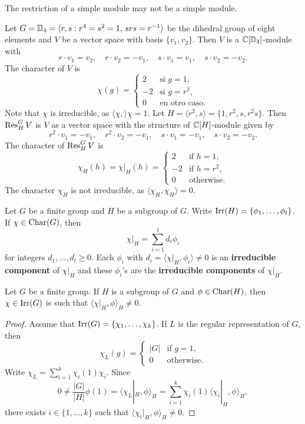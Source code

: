 The restriction of a simple module may not be a simple module. 

\begin{example}
    Let $G=\mathbb{D}_4=\langle r,s:r^4=s^2=1,\,srs=r^{-1}\rangle$ be the dihedral
    group of eight elements and 
    $V$ be a vector space with basis $\{v_1,v_2\}$. Then 
    $V$ is a $\mathbb{C}[\mathbb{D}_4]$-module with 
    \[
    r\cdot v_1=v_2,\quad
    r\cdot v_2=-v_1,\quad
    s\cdot v_1=v_1,\quad
    s\cdot v_2=-v_2.
    \]
    The character of $V$ is 
    \[
    \chi(g)=\begin{cases}
    2 & \text{si $g=1$},\\
    -2 & \text{si $g=r^2$},\\
    0 & \text{en otro caso}.
    \end{cases}
    \]
    Note that $\chi$ is irreducible, as $\langle\chi,\rangle\chi=1$.
    Let 
    $H=\langle r^2,s\rangle=\{1,r^2,s,r^2s\}$. Then $\operatorname{Res}_H^GV$ is $V$ as
    a vector space with the structure of 
    $\mathbb{C}[H]$-module given by 
    \[
    r^2\cdot v_1=-v_1,\quad
    r^2\cdot v_2=-v_1,\quad
    s\cdot v_1=-v_1,\quad
    s\cdot v_2=-v_2.
    \]
    The character of $\operatorname{Res}_H^GV$ is
    \[
    \chi_H(h)=\chi|_H(h)
    =\begin{cases}
    2 & \text{if $h=1$},\\
    -2 & \text{if $h=r^2$},\\
    0 & \text{otherwise}.
    \end{cases}
    \]
    The character $\chi_H$ is not irreducible, as 
    $\langle\chi_H,\chi_H\rangle=0$. 
\end{example}

Let $G$ be a finite group and 
$H$ be a subgroup of $G$. Write 
$\operatorname{Irr}(H)=\{\phi_1,\dots,\phi_l\}$.
If $\chi\in\operatorname{Char}(G)$, then
\[
\chi|_H=\sum_{i=1}^ld_i\phi_i
\]
for integers $d_1,\dots,d_l\geq 0$. 
Each $\phi_i$ with $d_i=\langle\chi|_H,\phi_i\rangle\ne 0$ 
is an \textbf{irreducible component} of $\chi|_H$ and these 
$\phi_i$'s are the \textbf{irreducible components} of 
$\chi|_H$. 

\begin{proposition}
    Let $G$ be a finite group. 
    If $H$ is a subgroup of $G$ and $\phi\in\operatorname{Char}(H)$, 
    then $\chi\in\operatorname{Irr}(G)$ is such that $\langle\chi|_H,\phi\rangle_H\ne 0$.
\end{proposition}

\begin{proof}
    Assume that $\operatorname{Irr}(G)=\{\chi_1,\dots,\chi_k\}$. 
    If $L$ is the regular representation of $G$, then 
    \[
    \chi_L(g)=\begin{cases}
    |G| & \text{if $g=1$},\\
    0 & \text{otherwise}.
    \end{cases}
    \]
    Write $\chi_L=\sum_{i=1}^k\chi_i(1)\chi_i$. Since 
    \[
    0\ne \frac{|G|}{|H|}\phi(1)=\langle \chi_L|_H,\phi\rangle_H=\sum_{i=1}^k\chi_i(1)\langle\chi_i|_H,\phi\rangle_H,
    \]
    there exists $i\in\{1,\dots,k\}$ 
    such that $\langle\chi_i|_H,\phi\rangle_H\ne 0$. 
\end{proof}

